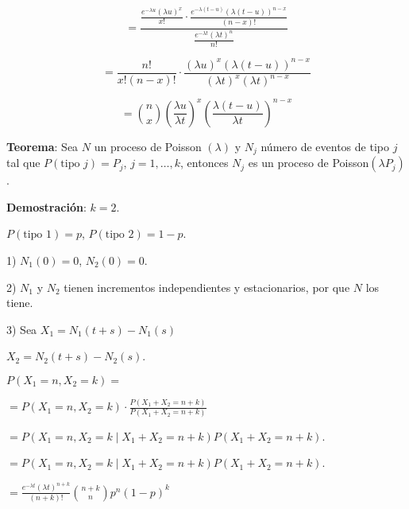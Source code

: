 \documentclass[12pt,a4paper]{article}
\newcommand{\teorema}[1]{%
\begin{teoremabox}
\textbf{Teorema}: #1
\end{teoremabox}
}
\begin{document}
\begin{equation*}
= \frac{\frac{e^{-\lambda u} (\lambda u)^x}{x!} \cdot \frac{e^{-\lambda(t-u)} (\lambda(t-u))^{n-x}}{(n-x)!}}{\frac{e^{-\lambda t} (\lambda t)^n}{n!}}
\end{equation*}

\begin{equation*}
= \frac{n!}{x!(n-x)!} \cdot \frac{(\lambda u)^x (\lambda(t-u))^{n-x}}{(\lambda t)^x (\lambda t)^{n-x}}
\end{equation*}

\begin{equation*}
= \binom{n}{x} \left(\frac{\lambda u}{\lambda t}\right)^x \left(\frac{\lambda(t-u)}{\lambda t}\right)^{n-x}
\end{equation*}

\teorema{Sea $N$ un proceso de Poisson $(\lambda)$ y $N_j$ número de eventos de tipo $j$ tal que $P(\text{tipo } j) = P_j$, $j = 1, \ldots, k$, entonces $N_j$ es un proceso de Poisson$(\lambda P_j)$.}

\textbf{Demostración}: $k = 2$.

$P(\text{tipo } 1) = p$, $P(\text{tipo } 2) = 1 - p$.

1) $N_1(0) = 0$, $N_2(0) = 0$.

2) $N_1$ y $N_2$ tienen incrementos independientes y estacionarios, por que $N$ los tiene.

3) Sea $X_1 = N_1(t+s) - N_1(s)$

$X_2 = N_2(t+s) - N_2(s)$.

$P(X_1 = n, X_2 = k) =$

$= P(X_1 = n, X_2 = k) \cdot \frac{P(X_1 + X_2 = n+k)}{P(X_1 + X_2 = n+k)}$

$= P(X_1 = n, X_2 = k \mid X_1 + X_2 = n+k) P(X_1 + X_2 = n+k)$.

$= P(X_1 = n, X_2 = k \mid X_1 + X_2 = n+k) P(X_1 + X_2 = n+k)$.

$= \frac{e^{-\lambda t} (\lambda t)^{n+k}}{(n+k)!} \binom{n+k}{n} p^n (1-p)^k$

\begin{center}
\end{center}
\end{document}

